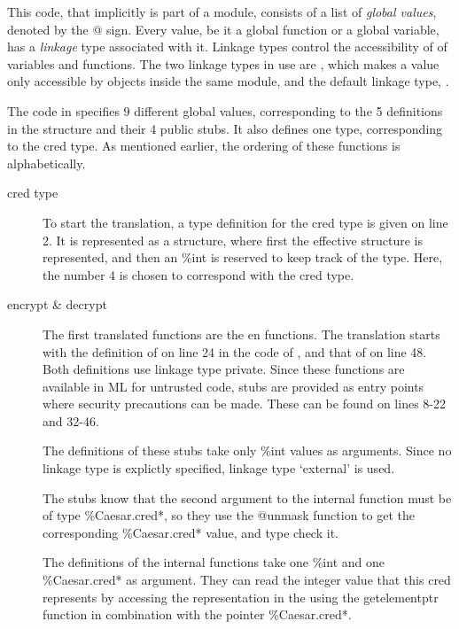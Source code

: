 This code, that implicitly is part of a module, consists of a list of \emph{global values}, denoted by the @ sign.
Every value, be it a global function or a global variable, has a \emph{linkage} type associated with it.
Linkage types control the accessibility of of variables and functions. The two linkage types in use are , which makes a value only accessible by objects inside the same module, and the default linkage type, .

The code in  specifies 9 different global values, corresponding to the 5 definitions in the  structure and their 4 public stubs. It also defines one type, corresponding to the cred type.
As mentioned earlier, the ordering of these functions is alphabetically.
\begin{description}
\item[cred type] To start the translation, a type definition for the cred type is given on line 2.
It is represented as a structure, where first the effective structure is represented, and then an \%int is reserved to keep track of the type.
Here, the number 4 is chosen to correspond with the cred type.

\item[encrypt \& decrypt] The first translated functions are the  en  functions. The translation starts with the definition of  on line 24 in the code of , and that of  on line 48.
Both definitions use linkage type private.
Since these functions are available in ML for untrusted code, stubs are provided as entry points where security precautions can be made. These can be found on lines 8-22 and 32-46.

The definitions of these stubs take only \%int values as arguments.
Since no linkage type is explictly specified, linkage type `external'  is used.

The stubs know that the second argument to the internal function must be of type \%Caesar.cred*, so they use the @unmask function to get the corresponding \%Caesar.cred* value, and type check it.

The definitions of the internal functions take one \%int and one \%Caesar.cred* as argument.
They can read the integer value that this cred represents by accessing the representation in the using the getelementptr function in combination with the pointer \%Caesar.cred*.


\end{description}
